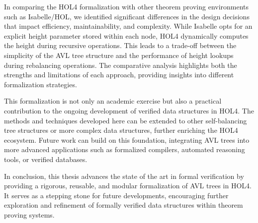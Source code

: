 \documentclass[12pt]{article}
\begin{document}
In comparing the HOL4 formalization with other theorem proving environments such as Isabelle/HOL, we identified significant differences in the design decisions that impact efficiency, maintainability, and complexity. While Isabelle opts for an explicit height parameter stored within each node, HOL4 dynamically computes the height during recursive operations. This leads to a trade-off between the simplicity of the AVL tree structure and the performance of height lookups during rebalancing operations. The comparative analysis highlights both the strengths and limitations of each approach, providing insights into different formalization strategies.

This formalization is not only an academic exercise but also a practical contribution to the ongoing development of verified data structures in HOL4. The methods and techniques developed here can be extended to other self-balancing tree structures or more complex data structures, further enriching the HOL4 ecosystem. Future work can build on this foundation, integrating AVL trees into more advanced applications such as formalized compilers, automated reasoning tools, or verified databases.

In conclusion, this thesis advances the state of the art in formal verification by providing a rigorous, reusable, and modular formalization of AVL trees in HOL4. It serves as a stepping stone for future developments, encouraging further exploration and refinement of formally verified data structures within theorem proving systems.



\end{document}
